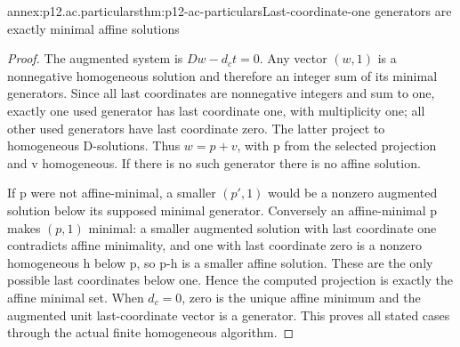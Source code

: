 \begin{annexitem}{annex:p12.ac.particulars}{thm:p12-ac-particulars}{Last-coordinate-one generators are exactly minimal affine solutions}
\begin{proof}
The augmented system is \(Dw-d_ct=0\). Any vector \((w,1)\)
is a nonnegative homogeneous solution and therefore an integer sum
of its minimal generators. Since all last coordinates are nonnegative
integers and sum to one, exactly one used generator has last coordinate
one, with multiplicity one; all other used generators have last
coordinate zero. The latter project to homogeneous D-solutions.
Thus \(w=p+v\), with p from the selected projection and v
homogeneous. If there is no such generator there is no affine solution.

If p were not affine-minimal, a smaller \((p',1)\) would be
a nonzero augmented solution below its supposed minimal generator.
Conversely an affine-minimal p makes \((p,1)\) minimal: a
smaller augmented solution with last coordinate one contradicts
affine minimality, and one with last coordinate zero is a nonzero
homogeneous h below p, so p-h is a smaller affine solution.
These are the only possible last coordinates below one. Hence
the computed projection is exactly the affine minimal set.
When \(d_c=0\), zero is the unique affine minimum and the
augmented unit last-coordinate vector is a generator. This proves
all stated cases through the actual finite homogeneous algorithm.
\end{proof}
\end{annexitem}

